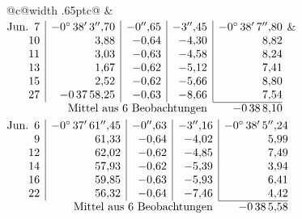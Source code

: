 \noindent\begin{tabular}{@{}c@{\hspace{.4em}\vrule width .65pt\hspace{.4em}}c@{}}
 &
 \\[.18ex]
\(\begin{array}[t]{@{}r|r|r|r|r@{}}
\text{Jun.}\enspace 7 & -0^\circ\,38'\,3''{,}70 & -0''{,}65 & -3''{,}45 & -0^\circ\,38'\,7''{,}80\\
10 & 3{,}88 & -0{,}64 & -4{,}30 & 8{,}82\\
11 & 3{,}03 & -0{,}63 & -4{,}58 & 8{,}24\\
13 & 1{,}67 & -0{,}62 & -5{,}12 & 7{,}41\\
15 & 2{,}52 & -0{,}62 & -5{,}66 & 8{,}80\\
27 & -0\,37\,58{,}25 & -0{,}63 & -8{,}66 & 7{,}54\\
\cline{5-5}
\multicolumn{4}{r}{\text{Mittel aus 6 Beobachtungen}} & -0\,38\,8{,}10
\end{array}\)
&
\(\begin{array}[t]{@{}r|r|r|r|r@{}}
\text{Jun.}\enspace 6 & -0^\circ\,37'\,61''{,}45 & -0''{,}63 & -3''{,}16 & -0^\circ\,38'\,5''{,}24\\
9 & 61{,}33 & -0{,}64 & -4{,}02 & 5{,}99\\
12 & 62{,}02 & -0{,}62 & -4{,}85 & 7{,}49\\
14 & 57{,}93 & -0{,}62 & -5{,}39 & 3{,}94\\
16 & 59{,}85 & -0{,}63 & -5{,}93 & 6{,}41\\
22 & 56{,}32 & -0{,}64 & -7{,}46 & 4{,}42\\
\cline{5-5}
\multicolumn{4}{r}{\text{Mittel aus 6 Beobachtungen}} & -0\,38\,5{,}58
\end{array}\)
\end{tabular}\par\medskip
{}
